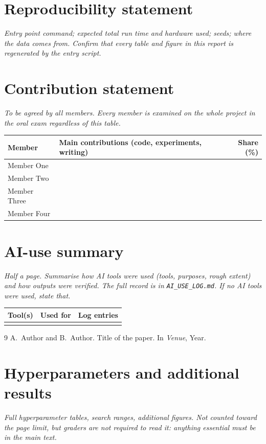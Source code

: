 \documentclass[11pt,a4paper]{article}
\newcommand{\guide}[1]{{\color{gray!85!black}\small\itshape #1\par}}
\begin{document}
\section*{Reproducibility statement}
\guide{Entry point command; expected total run time and hardware used; seeds; where the data comes from. Confirm that every table and figure in this report is regenerated by the entry script.}

\clearpage
\section*{Contribution statement}
\guide{To be agreed by all members. Every member is examined on the whole project in the oral exam regardless of this table.}

\begin{center}
\begin{tabularx}{\linewidth}{@{}lXr@{}}
\toprule
Member & Main contributions (code, experiments, writing) & Share (\%) \\
\midrule
Member One & & \\
Member Two & & \\
Member Three & & \\
Member Four & & \\
\bottomrule
\end{tabularx}
\end{center}

\section*{AI-use summary}
\guide{Half a page. Summarise how AI tools were used (tools, purposes, rough extent) and how outputs were verified. The full record is in \texttt{AI\_USE\_LOG.md}. If no AI tools were used, state that.}

\begin{center}
\begin{tabularx}{\linewidth}{@{}lXl@{}}
\toprule
Tool(s) & Used for & Log entries \\
\midrule
 & & \\
\bottomrule
\end{tabularx}
\end{center}


\begin{thebibliography}{9}
A.~Author and B.~Author.
\newblock Title of the paper.
\newblock In \emph{Venue}, Year.
\end{thebibliography}

\appendix
\section{Hyperparameters and additional results}
\guide{Full hyperparameter tables, search ranges, additional figures. Not counted toward the page limit, but graders are not required to read it: anything essential must be in the main text.}
\end{document}
